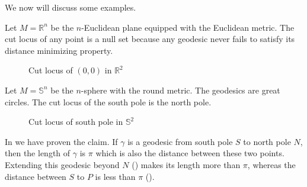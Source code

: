 \vspace{0.1cm}
\noindent We now will discuss some examples.
\begin{eg}
    Let $M=\mathbb{R}^n$ be the $n$-Euclidean plane equipped with the Euclidean metric. The cut locus of any point is a null set because any geodesic never fails to satisfy its distance minimizing property.
    \begin{figure}[!htb]
        \centering
        \caption{Cut locus of $(0,0)$ in $\mathbb{R}^2$ \label{fig:Example-CutLocus-EuclideanSpace}}
    \end{figure}
     
\end{eg}

\begin{eg}
    Let $M=\mathbb{S}^n$ be the $n$-sphere with the round metric. The geodesics are great circles. The cut locus of the south pole is the north pole. 
    \begin{figure}[H]
        \centering
        \begin{subfigure}{.30\textwidth}
          \centering
          \caption{}
          \label{fig:Sphere-CutLocusPoint-01}
        \end{subfigure}%
        \begin{subfigure}{.30\textwidth}
          \centering
          \caption{}
          \label{fig:Sphere-CutLocusPoint-02}
        \end{subfigure}
        \begin{subfigure}{.30\textwidth}
            \centering
            \caption{}
            \label{fig:Sphere-CutLocusPoint-03}
          \end{subfigure}
        \caption{Cut locus of south pole in $\mathbb{S}^2$}
            \label{fig:Sphere-CutLocusPoint}
    \end{figure}
    \noindent In  we have proven the claim. If $\gamma$ is a geodesic from south pole $S$ to north pole $N$, then the length of $\gamma$ is $\pi$ which is also the distance between these two points. Extending this geodesic beyond $N$ () makes its length more than $\pi$, whereas the distance between $S$ to $P$ is less than $\pi$ ().
\end{eg}

